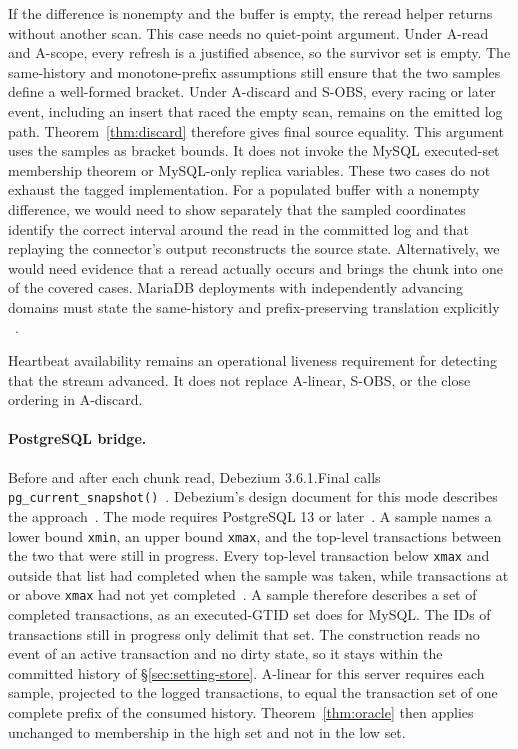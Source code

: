 \documentclass[sigconf,nonacm,10pt]{acmart}
\theoremstyle{plain}
\theoremstyle{definition}
\begin{document}
If the difference is nonempty and the buffer is empty, the reread
helper returns without another scan. This case needs no quiet-point
argument. Under A-read and A-scope, every refresh
is a justified absence, so the survivor set is empty. The same-history and 
monotone-prefix assumptions still ensure that the two samples define a well-formed 
bracket. Under A-discard and S-OBS, every racing or later event,
including an insert that raced the empty scan, remains on the emitted
log path. Theorem~\ref{thm:discard} therefore gives final source
equality. This argument uses the samples as bracket bounds. It does not
invoke the MySQL executed-set membership theorem or MySQL-only replica
variables. These two cases do not exhaust the tagged implementation.
For a populated buffer with a nonempty difference, we would need to
show separately that the sampled coordinates identify the correct
interval around the read in the committed log and that replaying the
connector's output reconstructs the source state. Alternatively, we
would need evidence that a reread actually occurs and brings the chunk
into one of the covered cases. MariaDB
deployments with independently advancing domains must state the same-history
and prefix-preserving translation explicitly
~\cite{mariadb_parallel_replication}.

Heartbeat availability remains an operational liveness requirement for detecting that 
the stream advanced. It does not replace A-linear, S-OBS, or the close
ordering in A-discard.

\paragraph{PostgreSQL bridge.}
Before and after each chunk read, Debezium 3.6.1.Final calls
\texttt{pg\_\allowbreak{}current\_\allowbreak{}snapshot()}~\cite{debezium_postgres_readonly_source}. Debezium's
design document for this mode describes the approach~\cite{debezium_ddd8}.
The mode requires PostgreSQL 13 or later~\cite{debezium_postgresql_connector}. A sample names a lower bound
\texttt{xmin}, an upper bound \texttt{xmax}, and the top-level
transactions between the two that were still in progress. Every
top-level transaction below \texttt{xmax} and outside that list had
completed when the sample was taken, while transactions at or above
\texttt{xmax} had not yet completed~\cite{postgres_snapshot_functions}. A sample
therefore describes a set of completed transactions, as an executed-GTID
set does for MySQL. The IDs of transactions still in progress
only delimit that set. The construction reads no event of an active
transaction and no dirty state, so it stays within the committed history
of \S\ref{sec:setting-store}. A-linear for this server requires each
sample, projected to the logged transactions, to equal the transaction
set of one complete prefix of the consumed history.
Theorem~\ref{thm:oracle} then applies unchanged to membership in the
high set and not in the low set.
\end{document}
